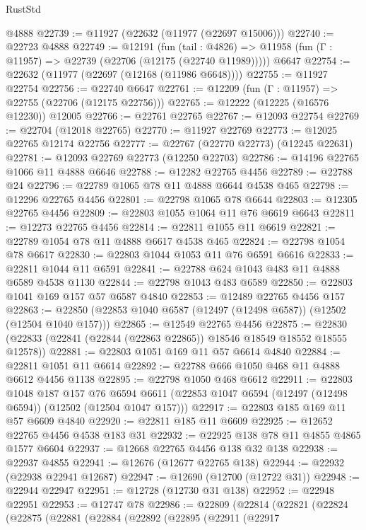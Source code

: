 \begin{lexlean}{RustStd}
\begin{coremodule}
    @4888
@22739 := @11927 (@22632 (@11977 (@22697 @15006)))
@22740 := @22723 @4888
@22749 := @12191
    (fun (tail : @4826) => @11958 (fun (Γ : @11957) => @22739 (@22706 (@12175 (@22740 @11989)))))
    @6647
@22754 := @22632 (@11977 (@22697 (@12168 (@11986 @6648))))
@22755 := @11927 @22754
@22756 := @22740 @6647
@22761 := @12209 (fun (Γ : @11957) => @22755 (@22706 (@12175 @22756)))
@22765 := @12222 (@12225 (@16576 @12230)) @12005
@22766 := @22761 @22765
@22767 := @12093 @22754
@22769 := @22704 (@12018 @22765)
@22770 := @11927 @22769
@22773 := @12025 @22765 @12174 @22756
@22777 := @22767 (@22770 @22773) (@12245 @22631)
@22781 := @12093 @22769 @22773 (@12250 @22703)
@22786 := @14196 @22765 @1066 @11 @4888 @6646
@22788 := @12282 @22765 @4456
@22789 := @22788 @24
@22796 := @22789 @1065 @78 @11 @4888 @6644 @4538 @465
@22798 := @12296 @22765 @4456
@22801 := @22798 @1065 @78 @6644
@22803 := @12305 @22765 @4456
@22809 := @22803 @1055 @1064 @11 @76 @6619 @6643
@22811 := @12273 @22765 @4456
@22814 := @22811 @1055 @11 @6619
@22821 := @22789 @1054 @78 @11 @4888 @6617 @4538 @465
@22824 := @22798 @1054 @78 @6617
@22830 := @22803 @1044 @1053 @11 @76 @6591 @6616
@22833 := @22811 @1044 @11 @6591
@22841 := @22788 @624 @1043 @483 @11 @4888 @6589 @4538 @1130
@22844 := @22798 @1043 @483 @6589
@22850 := @22803 @1041 @169 @157 @57 @6587 @4840
@22853 := @12489 @22765 @4456 @157
@22863 := @22850 (@22853 @1040 @6587 (@12497 (@12498 @6587)) (@12502 (@12504 @1040 @157)))
@22865 := @12549 @22765 @4456
@22875 := @22830 (@22833 (@22841 (@22844 (@22863 @22865)) @18546 @18549 @18552 @18555 @12578))
@22881 := @22803 @1051 @169 @11 @57 @6614 @4840
@22884 := @22811 @1051 @11 @6614
@22892 := @22788 @666 @1050 @468 @11 @4888 @6612 @4456 @1138
@22895 := @22798 @1050 @468 @6612
@22911 := @22803
    @1048
    @187
    @157
    @76
    @6594
    @6611
    (@22853 @1047 @6594 (@12497 (@12498 @6594)) (@12502 (@12504 @1047 @157)))
@22917 := @22803 @185 @169 @11 @57 @6609 @4840
@22920 := @22811 @185 @11 @6609
@22925 := @12652 @22765 @4456 @4538 @183 @31
@22932 := @22925 @138 @78 @11 @4855 @4865 @1577 @6604
@22937 := @12668 @22765 @4456 @138 @32 @138
@22938 := @22937 @4855
@22941 := @12676 (@12677 @22765 @138)
@22944 := @22932 (@22938 @22941 @12687)
@22947 := @12690 (@12700 (@12722 @31))
@22948 := @22944 @22947
@22951 := @12728 (@12730 @31 @138)
@22952 := @22948 @22951
@22953 := @12747 @78
@22986 := @22809
    (@22814
      (@22821
        (@22824
          (@22875
            (@22881
              (@22884
                (@22892
                  (@22895
                    (@22911
                      (@22917

\end{coremodule}
\end{lexlean}
